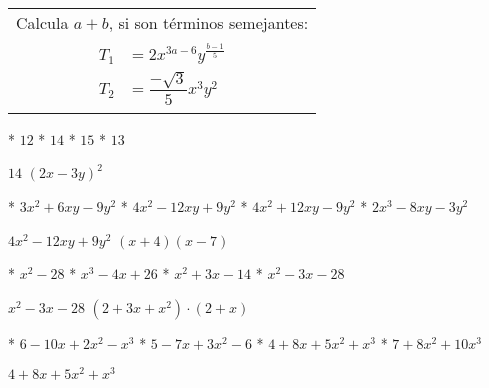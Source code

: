 \begin{tabular}{c}
	Calcula $a+b$, si son t\'erminos semejantes: \\
	$\begin{aligned}
		T_1&=2x^{3a-6}y^{\frac{b-1}{5}} \\
		T_2&=\dfrac{-\sqrt{3}}{5}x^3y^2
	\end{aligned}$
\end{tabular}
\begin{enum}
	* $12$
	* $14$
	* $15$
	* $13$
\end{enum}
$14$
$(2x-3y)^2$
\begin{enum}
	* $3x^2+6xy-9y^2$
	* $4x^2-12xy+9y^2$
	* $4x^2+12xy-9y^2$
	* $2x^3-8xy-3y^2$
\end{enum}
$4x^2-12xy+9y^2$
$(x+4)(x-7)$
\begin{enum}
	* $x^2-28$
	* $x^3-4x+26$
	* $x^2+3x-14$
	* $x^2-3x-28$
\end{enum}
$x^2-3x-28$
$\left(2+3x+x^2\right)\cdot(2+x)$
\begin{enum}
	* $6-10x+2x^2-x^3$
	* $5-7x+3x^2-6$
	* $4+8x+5x^2+x^3$
	* $7+8x^2+10x^3$
\end{enum}
$4+8x+5x^2+x^3$
